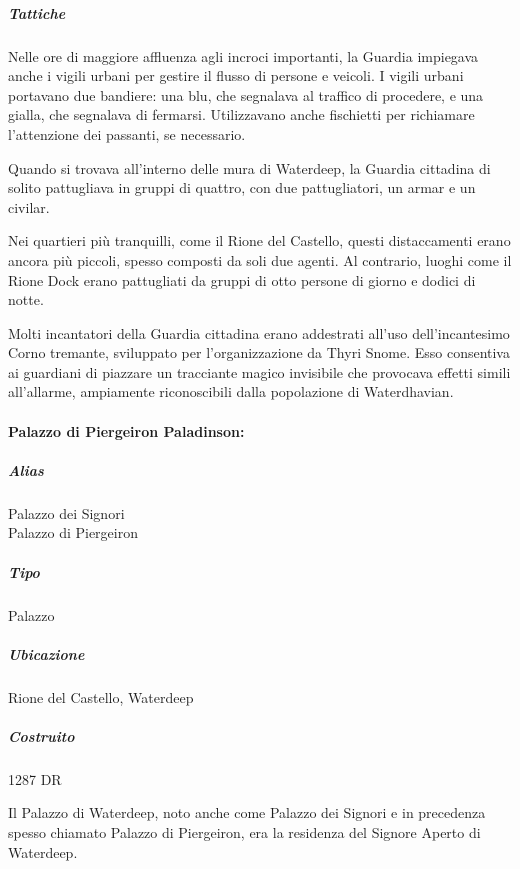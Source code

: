 \documentclass{article}
\begin{document}
                          \subparagraph{Tattiche}
                          Nelle ore di maggiore affluenza agli incroci importanti, la Guardia impiegava anche i vigili urbani per gestire il flusso di persone e veicoli. I vigili urbani portavano due bandiere: una blu, che segnalava al traffico di procedere, e una gialla, che segnalava di fermarsi. Utilizzavano anche fischietti per richiamare l'attenzione dei passanti, se necessario.
                          
                          Quando si trovava all'interno delle mura di Waterdeep, la Guardia cittadina di solito pattugliava in gruppi di quattro, con due pattugliatori, un armar e un civilar.
                          
                          Nei quartieri più tranquilli, come il Rione del Castello, questi distaccamenti erano ancora più piccoli, spesso composti da soli due agenti. Al contrario, luoghi come il Rione Dock erano pattugliati da gruppi di otto persone di giorno e dodici di notte.
                          
                          Molti incantatori della Guardia cittadina erano addestrati all'uso dell'incantesimo Corno tremante, sviluppato per l'organizzazione da Thyri Snome. Esso consentiva ai guardiani di piazzare un tracciante magico invisibile che provocava effetti simili all'allarme, ampiamente riconoscibili dalla popolazione di Waterdhavian.
                    \paragraph{Palazzo di Piergeiron Paladinson:}
                          \subparagraph{Alias}
                          Palazzo dei Signori \\
                          Palazzo di Piergeiron
                          
                          \subparagraph{Tipo}
                          Palazzo
                          
                          \subparagraph{Ubicazione}
                          Rione del Castello, Waterdeep
                          
                          \subparagraph{Costruito}
                          1287 DR
                          
                          Il Palazzo di Waterdeep, noto anche come Palazzo dei Signori e in precedenza spesso chiamato Palazzo di Piergeiron, era la residenza del Signore Aperto di Waterdeep.
                          
\end{document}
